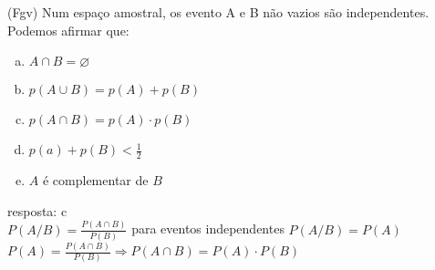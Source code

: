 \begin{ex}
(Fgv) Num espaço amostral, os evento A e B não vazios são independentes. Podemos afirmar que:
   \begin{enumerate}[(a)]
   \item $A\cap B = \varnothing $
   \item $ p(A\cup B) = p(A) +p (B)$
   \item $ p(A\cap B) = p(A)\cdot p(B)$
   \item $p(a) + p(B) < \frac{1}{2}$ 
   \item $A$ é complementar de $B$
   \end{enumerate}
       \begin{sol}
     resposta: c \\
     $P(A/B)=\frac{P(A\cap B)}{P(B)}$ \hspace{0,7cm} para eventos independentes $P(A/B)= P(A)$ \\
     $P(A)=\frac{P(A\cap B)}{P(B)}\Rightarrow P(A\cap B)=P(A)\cdot P(B)$
    \end{sol}
\end{ex}